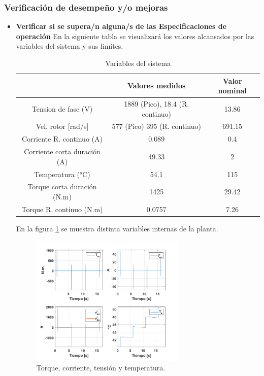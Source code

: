 \documentclass[10pt]{article}
\begin{document}
\subsubsection{Verificación de desempeño y/o mejoras}
\begin{itemize}
	\item \textbf{Verificar si se supera/n alguna/s de las Especificaciones de operación}
	En la siguiente tabla se visualizará los valores alcansados por las variables del sistema y sus límites.
	\begin{table}[!h]
		\begin{center}
		\begin{tabular}{| c | c | c | }
		\hline
		  & Valores medidos & Valor nominal  \\ \hline
		 Tension de fase (V) & 1889 (Pico), 18.4 (R. continuo) & 13.86\\ \hline
		 Vel. rotor [rad/s]& 577 (Pico) 395 (R. continuo)&  691.15\\ \hline
		Corriente R. continuo (A) &0.089 & 0.4\\ \hline
		Corriente corta duración (A) &49.33 &2\\ \hline
		Temperatura (°C) &54.1 & 115\\ \hline
		Torque corta duración (N.m) & 1425 & 29.42\\ \hline
		Torque R. continuo (N.m) & 0.0757 & 7.26\\ \hline
		\end{tabular}
		\caption{Variables del sistema}
		\label{tab:4}
		\end{center}
		\end{table}
En la figura \ref{fig:parametros} se muestra distinta variables internas de la planta.
\begin{figure}[h!]
	\centering
	\includegraphics[width=0.7\textwidth]{parametros.png}
	\caption{\label{fig:parametros}Torque, corriente, tensión y temperatura.}
	\end{figure}


\end{itemize}
\end{document}
